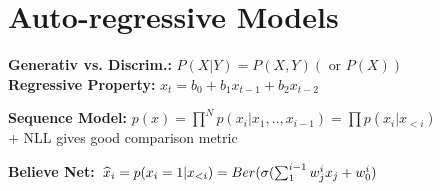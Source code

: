 \section{Auto-regressive Models}
\textbf{Generativ vs. Discrim.:} $P(X|Y) = P(X, Y) (\text{ or } P(X))$\\

\textbf{Regressive Property:} $x_t = b_0 + b_1 x_{t-1} + b_2 x_{t-2}$

\textbf{Sequence Model:} $p(x) = \prod^N p(x_i | x_1,..,x_{i-1}) = \prod p(x_i | x_{<i})$\\
+ NLL gives good comparison metric\\

\textbf{Believe Net:} $\widehat{x}_i = p(x_i = 1 | x_{<i}) = Ber(\sigma(\sum_1^{i-1} w_j^i x_j + w_0^i)$

